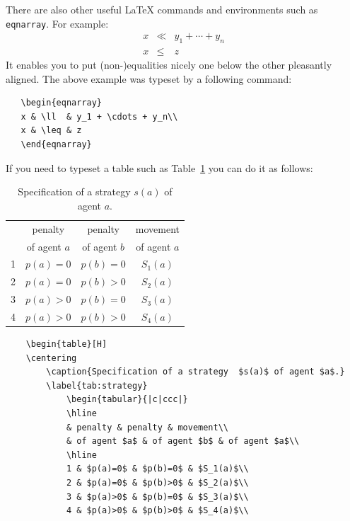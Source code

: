 \documentclass{iitsrc}
\begin{document}
\begin{multicols}{2}
There are also other useful \LaTeX{} commands and environments such as
\verb|eqnarray|. For example:
\begin{eqnarray}
x & \ll  & y_1 + \cdots + y_n\\
x & \leq & z
\end{eqnarray}
It enables you to put (non-)equalities nicely one below the other
pleasantly aligned. The above example was typeset by a following
command:
\begin{lstlisting}
   \begin{eqnarray}
   x & \ll  & y_1 + \cdots + y_n\\
   x & \leq & z
   \end{eqnarray}
\end{lstlisting}
%
If you need to typeset a table such as Table~\ref{tab:strategy} you can do it as follows:
%
\begin{table}[H]
\centering
    \caption{Specification of a strategy  $s(a)$ of agent $a$.}
    \label{tab:strategy}
        \begin{tabular}{|c|ccc|}
        \hline
        & penalty & penalty & movement\\
        & of agent $a$ & of agent $b$ & of agent $a$\\
        \hline
        1 & $p(a)=0$ & $p(b)=0$ & $S_1(a)$\\
        2 & $p(a)=0$ & $p(b)>0$ & $S_2(a)$\\
        3 & $p(a)>0$ & $p(b)=0$ & $S_3(a)$\\
        4 & $p(a)>0$ & $p(b)>0$ & $S_4(a)$\\
        \hline
    \end{tabular}
\end{table}
%
\begin{lstlisting}
    \begin{table}[H]
    \centering
        \caption{Specification of a strategy  $s(a)$ of agent $a$.}
        \label{tab:strategy}
            \begin{tabular}{|c|ccc|}
            \hline
            & penalty & penalty & movement\\
            & of agent $a$ & of agent $b$ & of agent $a$\\
            \hline
            1 & $p(a)=0$ & $p(b)=0$ & $S_1(a)$\\
            2 & $p(a)=0$ & $p(b)>0$ & $S_2(a)$\\
            3 & $p(a)>0$ & $p(b)=0$ & $S_3(a)$\\
            4 & $p(a)>0$ & $p(b)>0$ & $S_4(a)$\\

\end{lstlisting}
\end{multicols}
\end{document}
